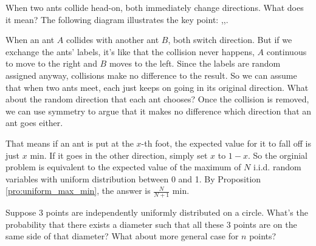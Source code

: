 \begin{solution}[\bf Solution.]%
When two ants collide head-on, both immediately change directions. What does it mean? The following diagram illustrates the key point:
\be
{},\quad {},\quad {}.
\ee

When an ant $A$ collides with another ant $B$, both switch direction. But if we exchange the ants' labels, it's like that the collision never happens, $A$ continuous to move to the right and $B$ moves to the left. Since the labels are random assigned anyway, collisions make no difference to the result. So we can assume that when two ants meet, each just keeps on going in its original direction. What about the random direction that each ant chooses? Once the collision is removed, we can use symmetry to argue that it makes no difference which direction that an ant goes either.

That means if an ant is put at the $x$-th foot, the expected value for it to fall off is just $x$ min. If it goes in the other direction, simply set $x$ to $1-x$. So the orginial problem is equivalent to the expected value of the maximum of $N$ i.i.d. random variables with uniform distribution between 0 and 1. By Proposition \ref{pro:uniform_max_min}, the answer is $\frac{N}{N+1}$ min.
\end{solution}

\begin{problem}
Suppose 3 points are independently uniformly distributed on a circle. What's the probability that there exists a diameter such that all these 3 points are on the same side of that diameter? What about more general case for $n$ points?
\end{problem}

